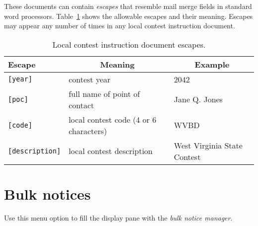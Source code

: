 \documentclass[11pt,letterpaper]{refart}
\newenvironment{fulltable}[1][tbp]
 {\begin{table}[#1]%
  \hspace*{-\leftmarginwidth}%
  \begin{minipage}{\fullwidth}}
 {\end{minipage}\end{table}}
\begin{document}
These documents can contain \emph{escapes} that resemble mail merge
fields in standard word processors. Table~\ref{tbl:lcescapes} shows the
allowable escapes and their meaning. Escapes may appear any number
of times in any local contest instruction document.\
\begin{fulltable}
\centering
\caption{Local contest instruction document escapes.}
\begin{tabular}{lll}
{\bfseries Escape} & 
  \multicolumn{1}{c}{\bfseries Meaning} & 
  \multicolumn{1}{c}{\bfseries Example} \\ \hline
\texttt{[year]} & contest year & 2042 \\
\texttt{[poc]}  & full name of point of contact & Jane Q. Jones \\
\texttt{[code]}  & local contest code (4 or 6 characters) & WVBD \\
\texttt{[description]}  & local contest description & West Virginia State Contest
\end{tabular}
\label{tbl:lcescapes}
\end{fulltable}

\section{Bulk notices}
Use this menu option to fill the display pane with the \emph{bulk notice manager}.
\end{document}

